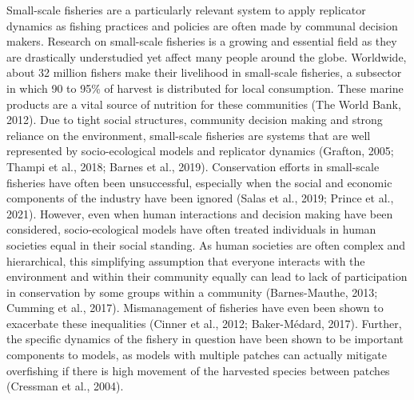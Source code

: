 \documentclass[
]{article}
\begin{document}
Small-scale fisheries are a particularly relevant system to apply replicator dynamics as fishing practices and policies are often made by communal decision makers. Research on small-scale fisheries is a growing and essential field as they are drastically understudied yet affect many people around the globe. Worldwide, about 32 million fishers make their livelihood in small-scale fisheries, a subsector in which 90 to 95\% of harvest is distributed for local consumption. These marine products are a vital source of nutrition for these communities (The World Bank, 2012). Due to tight social structures, community decision making and strong reliance on the environment, small-scale fisheries are systems that are well represented by socio-ecological models and replicator dynamics (Grafton, 2005; Thampi et al., 2018; Barnes et al., 2019). Conservation efforts in small-scale fisheries have often been unsuccessful, especially when the social and economic components of the industry have been ignored (Salas et al., 2019; Prince et al., 2021). However, even when human interactions and decision making have been considered, socio-ecological models have often treated individuals in human societies equal in their social standing. As human societies are often complex and hierarchical, this simplifying assumption that everyone interacts with the environment and within their community equally can lead to lack of participation in conservation by some groups within a community (Barnes-Mauthe, 2013; Cumming et al., 2017). Mismanagement of fisheries have even been shown to exacerbate these inequalities (Cinner et al., 2012; Baker-Médard, 2017). Further, the specific dynamics of the fishery in question have been shown to be important components to models, as models with multiple patches can actually mitigate overfishing if there is high movement of the harvested species between patches (Cressman et al., 2004).
\end{document}

